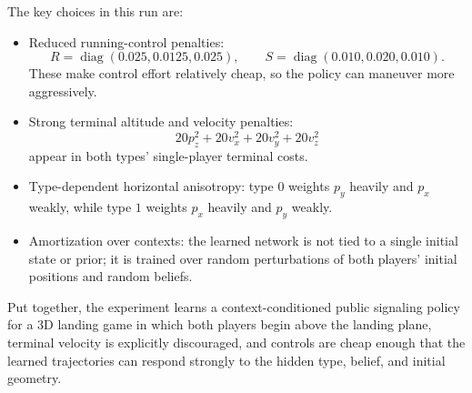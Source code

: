 \documentclass[11pt]{article}
\begin{document}
The key choices in this run are:
\begin{itemize}
    \item Reduced running-control penalties:
    \[
        R=\operatorname{diag}(0.025,0.0125,0.025),
        \qquad
        S=\operatorname{diag}(0.010,0.020,0.010).
    \]
    These make control effort relatively cheap, so the policy can maneuver more
    aggressively.
    \item Strong terminal altitude and velocity penalties:
    \[
        20p_z^2 + 20v_x^2 + 20v_y^2 + 20v_z^2
    \]
    appear in both types' single-player terminal costs.
    \item Type-dependent horizontal anisotropy:
    type $0$ weights $p_y$ heavily and $p_x$ weakly, while type $1$ weights
    $p_x$ heavily and $p_y$ weakly.
    \item Amortization over contexts:
    the learned network is not tied to a single initial state or prior; it is
    trained over random perturbations of both players' initial positions and
    random beliefs.
\end{itemize}

Put together, the experiment learns a context-conditioned public signaling
policy for a 3D landing game in which both players begin above the landing
plane, terminal velocity is explicitly discouraged, and controls are cheap
enough that the learned trajectories can respond strongly to the hidden type,
belief, and initial geometry.
\end{document}
